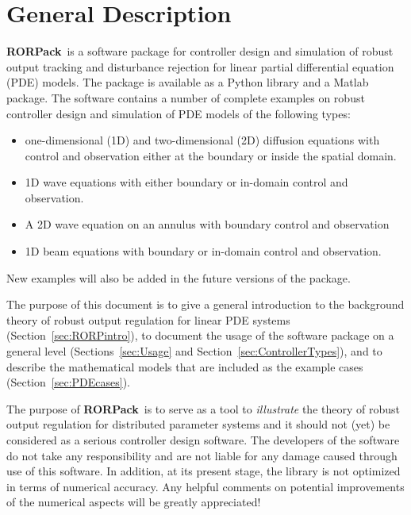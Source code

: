 \documentclass[11pt, a4paper]{amsart}
\theoremstyle{definition}
\numberwithin{equation}{section}
\newcommand{\RORname}{\textbf{RORPack}}
\begin{document}
\section{General Description}

\RORname\ is a software package
for controller design and simulation of robust output tracking and disturbance rejection for linear partial differential equation (PDE) models. 
The package is available as a Python library and a Matlab package.
The software contains a number of complete examples on robust controller design and simulation of PDE models
of the following types:
\begin{itemize}
  \item one-dimensional (1D) and two-dimensional (2D) diffusion equations with control and observation either at the boundary or inside the spatial domain.
  \item 1D wave equations with either boundary or in-domain control and observation.
    \item A 2D wave equation on an annulus with boundary control and observation
\item 1D beam equations with boundary or in-domain control and observation.
\end{itemize}
New examples will also be added in the future versions of the package.

The purpose of this document is to give a general introduction to the background theory of robust output regulation for linear PDE systems (Section~\ref{sec:RORPintro}), 
 to document the usage of the software package on a general level (Sections~\ref{sec:Usage} and Section~\ref{sec:ControllerTypes}), and 
to describe the mathematical models that are included as the example cases (Section~\ref{sec:PDEcases}).
 
The purpose of \RORname\ is to serve as a tool to \textit{illustrate} the theory of robust output regulation for distributed parameter systems and it should not (yet) be considered as a serious controller design software. 
The developers of the software do not take any responsibility and are not liable for any damage caused through use of this software.
In addition, at its present stage, the library is not optimized in terms of numerical accuracy. Any helpful comments on potential improvements of the numerical aspects will be greatly appreciated!
\end{document}

